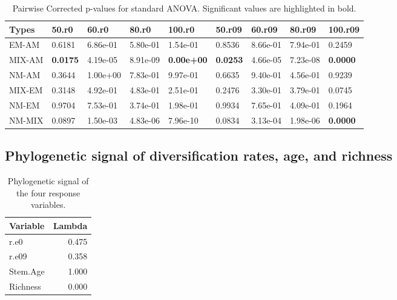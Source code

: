 \documentclass[]{article}
\begin{document}
\begin{table}[H]

\caption{\label{tab:unnamed-chunk-10}Pairwise Corrected p-values for standard ANOVA. Significant values are highlighted in bold.}
\centering
\begin{tabular}{l|l|l|l|l|l|l|l|l}
\hline
Types & 50.r0 & 60.r0 & 80.r0 & 100.r0 & 50.r09 & 60.r09 & 80.r09 & 100.r09\\
\hline
EM-AM & 0.6181 & 6.86e-01 & 5.80e-01 & 1.54e-01 & 0.8536 & 8.66e-01 & 7.94e-01 & 0.2459\\
\hline
MIX-AM & \textbf{0.0175} & 4.19e-05 & 8.91e-09 & \textbf{0.00e+00} & \textbf{0.0253} & 4.66e-05 & 7.23e-08 & \textbf{0.0000}\\
\hline
NM-AM & 0.3644 & 1.00e+00 & 7.83e-01 & 9.97e-01 & 0.6635 & 9.40e-01 & 4.56e-01 & 0.9239\\
\hline
MIX-EM & 0.3148 & 4.92e-01 & 4.83e-01 & 2.51e-01 & 0.2476 & 3.30e-01 & 3.79e-01 & 0.0745\\
\hline
NM-EM & 0.9704 & 7.53e-01 & 3.74e-01 & 1.98e-01 & 0.9934 & 7.65e-01 & 4.09e-01 & 0.1964\\
\hline
NM-MIX & 0.0897 & 1.50e-03 & 4.83e-06 & 7.96e-10 & 0.0834 & 3.13e-04 & 1.98e-06 & \textbf{0.0000}\\
\hline
\end{tabular}
\end{table}

\hypertarget{phylogenetic-signal-of-diversification-rates-age-and-richness}{%
\subsection{Phylogenetic signal of diversification rates, age, and
richness}\label{phylogenetic-signal-of-diversification-rates-age-and-richness}}

\begin{table}[H]

\caption{\label{tab:unnamed-chunk-11}Phylogenetic signal of the four response variables.}
\centering
\begin{tabular}{l|r}
\hline
Variable & Lambda\\
\hline
r.e0 & 0.475\\
\hline
r.e09 & 0.358\\
\hline
Stem.Age & 1.000\\
\hline
Richness & 0.000\\
\hline
\end{tabular}
\end{table}
\end{document}

